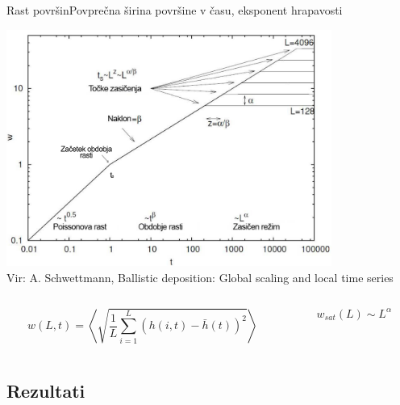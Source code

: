 \documentclass{beamer}
\begin{document}
\begin{frame}{Rast površin}{Povprečna širina površine v času, eksponent hrapavosti}
\begin{center}
  \footnotesize
  \includegraphics[width=0.8\textwidth]{slike/bdep3}
  \\ \tiny{Vir: A. Schwettmann, Ballistic deposition: Global scaling and local time series}
  \newline

\begin{columns}
  \begin{column}{0.6\textwidth}
    \begin{equation} w(L,t) = \left\langle \sqrt{\frac{1}{L} \sum_{i=1}^L (h(i,t)-\bar{h}(t))^2} \right\rangle \end{equation}
  \end{column}
  \begin{column}{0.4\textwidth}
    \begin{equation} w_{sat}(L) \sim L^\alpha \end{equation}
  \end{column}
\end{columns}
\end{center}
\end{frame}


\subsection{Rezultati}
\end{document}
